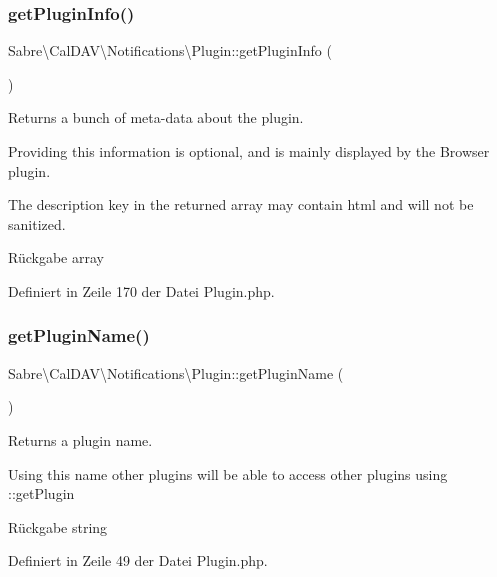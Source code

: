 \subsubsection{\texorpdfstring{get\+Plugin\+Info()}{getPluginInfo()}}
{\footnotesize\ttfamily Sabre\textbackslash{}\+Cal\+D\+A\+V\textbackslash{}\+Notifications\textbackslash{}\+Plugin\+::get\+Plugin\+Info (\begin{DoxyParamCaption}{ }\end{DoxyParamCaption})}

Returns a bunch of meta-\/data about the plugin.

Providing this information is optional, and is mainly displayed by the Browser plugin.

The description key in the returned array may contain html and will not be sanitized.

\begin{DoxyReturn}{Rückgabe}
array 
\end{DoxyReturn}


Definiert in Zeile 170 der Datei Plugin.\+php.

\mbox{\label{class_sabre_1_1_cal_d_a_v_1_1_notifications_1_1_plugin_ae5ad126289787eca8c0f8ffc44b6afc7}} 
\subsubsection{\texorpdfstring{get\+Plugin\+Name()}{getPluginName()}}
{\footnotesize\ttfamily Sabre\textbackslash{}\+Cal\+D\+A\+V\textbackslash{}\+Notifications\textbackslash{}\+Plugin\+::get\+Plugin\+Name (\begin{DoxyParamCaption}{ }\end{DoxyParamCaption})}

Returns a plugin name.

Using this name other plugins will be able to access other plugins using \+::get\+Plugin

\begin{DoxyReturn}{Rückgabe}
string 
\end{DoxyReturn}


Definiert in Zeile 49 der Datei Plugin.\+php.

